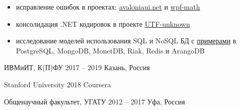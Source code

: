 \documentclass[10pt,a4paper,ragged2e,withhyper]{altacv}
\begin{document}
\begin{paracol}{2}
\begin{itemize}
  \item исправление ошибок в проектах:
  \href{https://github.com/AvaloniaUI/avaloniaui.net/commits?author=rstm-sf}{avaloniaui.net} и
  \href{https://github.com/ForNeVeR/wpf-math/commits?author=rstm-sf}{wpf-math}
  \smallskip

  \item консолидация .NET кодировок в проекте 
  \href{https://github.com/CharsetDetector/UTF-unknown/commits?author=rstm-sf}{UTF-unknown}
  \smallskip

  \item исследование моделей использования SQL и NoSQL БД с
  \href{https://bitbucket.org/rstm-sf/game_with_db}{примерами} в
  PostgreSQL, MongoDB, MonetDB, Riak, Redis и ArangoDB

\end{itemize}

\switchcolumn




\smallskip
{}


{ИВМиИТ, К(П)ФУ}
{2017 -- 2019}
{Казань, Россия}

\divider

{Stanford University}
{2018}
{Coursera}

\divider

{Общенаучный факультет, УГАТУ}
{2012 -- 2017}
{Уфа, Россия}


\nocite{*}

\printbibliography[heading=pubtype,title={\printinfo{\faUsers}{Труды конференции}},type=inproceedings]

\end{paracol}
\end{document}
